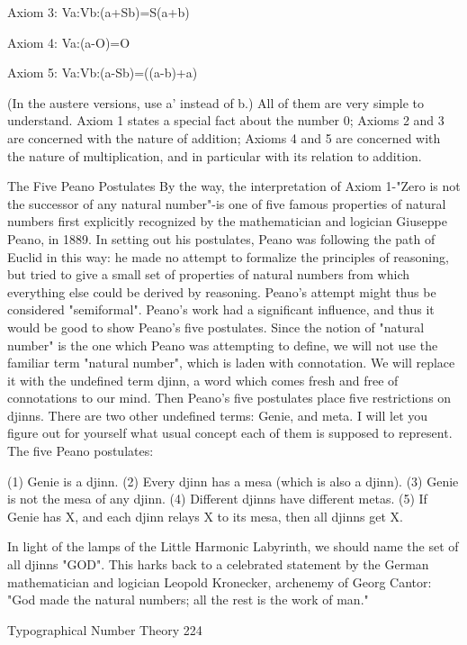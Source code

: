 Axiom 3: Va:Vb:(a+Sb)=S(a+b)

Axiom 4: Va:(a-O)=O

Axiom 5: Va:Vb:(a-Sb)=((a-b)+a)

(In the austere versions, use a' instead of b.) All of them are very simple to understand.
Axiom 1 states a special fact about the number 0; Axioms 2 and 3 are concerned with the
nature of addition; Axioms 4 and 5 are concerned with the nature of multiplication, and in
particular with its relation to addition.

                             The Five Peano Postulates
By the way, the interpretation of Axiom 1-"Zero is not the successor of any natural
number"-is one of five famous properties of natural numbers first explicitly recognized
by the mathematician and logician Giuseppe Peano, in 1889. In setting out his postulates,
Peano was following the path of Euclid in this way: he made no attempt to formalize the
principles of reasoning, but tried to give a small set of properties of natural numbers from
which everything else could be derived by reasoning. Peano's attempt might thus be
considered "semiformal". Peano's work had a significant influence, and thus it would be
good to show Peano's five postulates. Since the notion of "natural number" is the one
which Peano was attempting to define, we will not use the familiar term "natural
number", which is laden with connotation. We will replace it with the undefined term
djinn, a word which comes fresh and free of connotations to our mind. Then Peano's five
postulates place five restrictions on djinns. There are two other undefined terms: Genie,
and meta. I will let you figure out for yourself what usual concept each of them is
supposed to represent. The five Peano postulates:

   (1) Genie is a djinn.
   (2) Every djinn has a mesa (which is also a djinn).
   (3) Genie is not the mesa of any djinn. (4) Different djinns have different metas.
   (5) If Genie has X, and each djinn relays X to its mesa, then all djinns get X.

In light of the lamps of the Little Harmonic Labyrinth, we should name the set of all
djinns "GOD". This harks back to a celebrated statement by the German mathematician
and logician Leopold Kronecker, archenemy of Georg Cantor: "God made the natural
numbers; all the rest is the work of man."




Typographical Number Theory                                                             224

